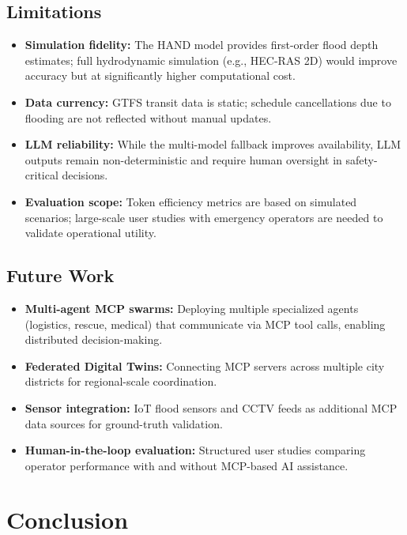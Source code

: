 \documentclass[journal]{IEEEtran}
\begin{document}
\subsection{Limitations}
\begin{itemize}[leftmargin=*]
    \item \textbf{Simulation fidelity:} The HAND model provides
    first-order flood depth estimates; full hydrodynamic simulation (e.g.,
    HEC-RAS 2D) would improve accuracy but at significantly higher
    computational cost.
    \item \textbf{Data currency:} GTFS transit data is static; schedule
    cancellations due to flooding are not reflected without manual updates.
    \item \textbf{LLM reliability:} While the multi-model fallback improves
    availability, LLM outputs remain non-deterministic and require human
    oversight in safety-critical decisions.
    \item \textbf{Evaluation scope:} Token efficiency metrics are based on
    simulated scenarios; large-scale user studies with emergency operators
    are needed to validate operational utility.
\end{itemize}

\subsection{Future Work}
\begin{itemize}[leftmargin=*]
    \item \textbf{Multi-agent MCP swarms:} Deploying multiple specialized
    agents (logistics, rescue, medical) that communicate via MCP tool calls,
    enabling distributed decision-making.
    \item \textbf{Federated Digital Twins:} Connecting MCP servers across
    multiple city districts for regional-scale coordination.
    \item \textbf{Sensor integration:} IoT flood sensors and CCTV feeds
    as additional MCP data sources for ground-truth validation.
    \item \textbf{Human-in-the-loop evaluation:} Structured user studies
    comparing operator performance with and without MCP-based AI assistance.
\end{itemize}


\section{Conclusion}
\label{sec:conclusion}
\end{document}
